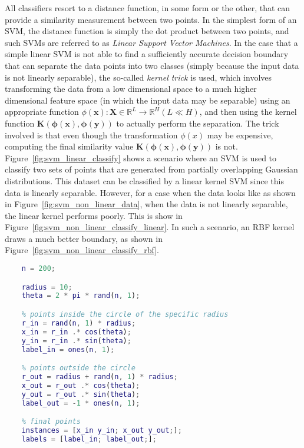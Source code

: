 All classifiers resort to a distance function, in some form or the other, that can provide a similarity measurement between two points. In the simplest form of an SVM, the distance function is simply the dot product between two points, and such SVMs are referred to as \emph{Linear Support Vector Machines}. In the case that a simple linear SVM is not able to find a sufficiently accurate decision boundary that can separate the data points into two classes (simply because the input data is not linearly separable), the so-called \emph{kernel trick} is used, which involves transforming the data from a low dimensional space to a much higher dimensional feature space (in which the input data may be separable) using an appropriate function $\phi(\mathbf{x}): \mathbf{X} \in \mathbb{R}^{L} \rightarrow \mathbb{R}^H (L \ll H)$, and then using the kernel function $\mathbf{K(\phi(x), \phi(y))}$ to actually perform the separation. The trick involved is that even though the transformation $\phi(x)$ may be expensive, computing the final similarity value $\mathbf{K(\phi(x), \phi(y))}$ is not.\\

Figure~\ref{fig:svm_linear_classify} shows a scenario where an SVM is used to classify two sets of points that are generated from partially overlapping Gaussian distributions. This dataset can be classified by a linear kernel SVM since this data is linearly separable. However, for a case when the data looks like as shown in Figure~\ref{fig:svm_non_linear_data}, when the data is not linearly separable, the linear kernel performs poorly. This is show in Figure~\ref{fig:svm_non_linear_classify_linear}. In such a scenario, an RBF kernel draws a much better boundary, as shown in Figure~\ref{fig:svm_non_linear_classify_rbf}.

\begin{lstlisting}[language=Matlab,frame=single,captionpos=b,caption={Generating the dataset to be classified by a linear classifier},label={lst:svm_linear_classify}]
    % total number of points for each class
    n = 200;

    radius = 10;
    theta = 2 * pi * rand(n, 1);

    % points inside the circle of the specific radius
    r_in = rand(n, 1) * radius;
    x_in = r_in .* cos(theta);
    y_in = r_in .* sin(theta);
    label_in = ones(n, 1);

    % points outside the circle
    r_out = radius + rand(n, 1) * radius;
    x_out = r_out .* cos(theta);
    y_out = r_out .* sin(theta);
    label_out = -1 * ones(n, 1);

    % final points
    instances = [x_in y_in; x_out y_out;];
    labels = [label_in; label_out;];
\end{lstlisting}

